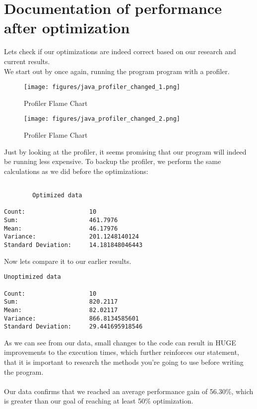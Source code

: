 \section{Documentation of performance after optimization}
Lets check if our optimizations are indeed correct based on our research and current results.\\
We start out by once again, running the program program with a profiler.

\begin{figure}[h]
    \caption{Profiler Flame Chart}
    \texttt{[image: figures/java\_profiler\_changed\_1.png]}
    \label{fig:call-tree-unchanged}
\end{figure}

\begin{figure}[h]
    \caption{Profiler Flame Chart}
    \texttt{[image: figures/java\_profiler\_changed\_2.png]}
    \label{fig:call-tree-unchanged}
\end{figure}

Just by looking at the profiler, it seems promising that our program will indeed be running less expensive.
To backup the profiler, we perform the same calculations as we did before the optimizations:

\begin{lstlisting}[]
        
        Optimized data

Count:                  10
Sum:                    461.7976
Mean:                   46.17976
Variance:               201.1248140124
Standard Deviation:     14.181848046443 
\end{lstlisting}

\vspace{30px}
Now lets compare it to our earlier results.
\vspace{20px}

\begin{lstlisting}[]        
        Unoptimized data

Count:                  10
Sum:                    820.2117
Mean:                   82.02117
Variance:               866.8134585601
Standard Deviation:     29.441695918546
\end{lstlisting}

\newpage

As we can see from our data, small changes to the code can result in HUGE improvements to the execution times, which further reinforces our statement, that it is important to research the methods you're going to use before writing the program.\\\\

Our data confirms that we reached an average performance gain of 56.30\%, which is greater than our goal of reaching at least 50\% optimization.